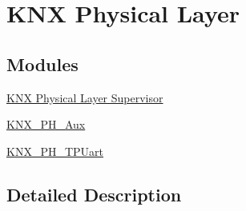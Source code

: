 \hypertarget{group___k_n_x___p_h}{}\section{K\+NX Physical Layer}
\label{group___k_n_x___p_h}
\subsection*{Modules}
\begin{DoxyCompactItemize}
\item 
\hyperlink{group___k_n_x___p_h___sup}{K\+N\+X Physical Layer Supervisor}
\item 
\hyperlink{group___k_n_x___p_h___aux}{K\+N\+X\+\_\+\+P\+H\+\_\+\+Aux}
\item 
\hyperlink{group___k_n_x___p_h___t_p_uart}{K\+N\+X\+\_\+\+P\+H\+\_\+\+T\+P\+Uart}
\end{DoxyCompactItemize}


\subsection{Detailed Description}

